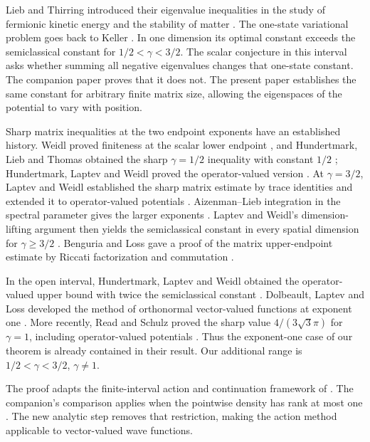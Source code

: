 Lieb and Thirring introduced their eigenvalue inequalities in the study
of fermionic kinetic energy and the stability of matter
\cite{LiebThirring1975,LiebThirring1976}.
The one-state variational problem goes back to Keller \cite{Keller1961}.
In one dimension its optimal constant exceeds the semiclassical constant
for $1/2<\gamma<3/2$. The scalar conjecture in this interval asks whether
summing all negative eigenvalues changes that one-state constant.
The companion paper \cite[Theorem~1.1]{ScalarCompanion} proves that it does
not. The present paper establishes the same constant for arbitrary finite
matrix size, allowing the eigenspaces of the potential to vary with position.

Sharp matrix inequalities at the two endpoint exponents have an
established history. Weidl proved finiteness at the scalar lower endpoint
\cite{Weidl1996}, and Hundertmark, Lieb and Thomas obtained the sharp
$\gamma=1/2$ inequality with constant $1/2$
\cite[Theorem~1]{HLT1998}; Hundertmark, Laptev and Weidl proved the
operator-valued version \cite[Theorem~3.1]{HLW2000}.
At $\gamma=3/2$, Laptev and Weidl established the sharp matrix estimate by
trace identities and extended it to operator-valued potentials
\cite[Theorems~2.1 and~2.2]{LaptevWeidl2000}.
Aizenman--Lieb integration in the spectral parameter gives the larger
exponents \cite{AizenmanLieb1978}. Laptev and Weidl's dimension-lifting
argument then yields the semiclassical constant in every spatial dimension
for $\gamma\ge3/2$ \cite[Theorem~3.1]{LaptevWeidl2000}.
Benguria and Loss gave a proof of the matrix upper-endpoint estimate by
Riccati factorization and commutation \cite{BenguriaLoss2000}.

In the open interval, Hundertmark, Laptev and Weidl obtained the
operator-valued upper bound with twice the semiclassical constant
\cite[Theorem~4.1]{HLW2000}.
Dolbeault, Laptev and Loss developed the method of orthonormal
vector-valued functions at exponent one
\cite[Theorems~1 and~3]{DLL2008}.
More recently, Read and Schulz proved the sharp value
$4/(3\sqrt3\pi)$ for $\gamma=1$, including operator-valued potentials
\cite[Proposition~4 and Equation~(2.1)]{ReadSchulz2026}.
Thus the exponent-one case of our theorem is already contained in their
result. Our additional range is $1/2<\gamma<3/2$, $\gamma\ne1$.

The proof adapts the finite-interval action and continuation framework
of \cite[Theorem~2.1, Proposition~5.1 and Section~6]{ScalarCompanion}.
The companion's comparison applies when the pointwise density has rank
at most one \cite[Proposition~4.1]{ScalarCompanion}.
The new analytic step removes that restriction, making the action method
applicable to vector-valued wave functions.

